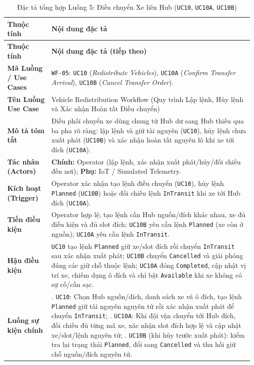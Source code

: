 {\small
\begin{longtable}{>{\raggedright\arraybackslash\bfseries}p{3.5cm} >{\raggedright\arraybackslash}p{\dimexpr\textwidth-3.5cm-4\tabcolsep\relax}}
\caption{Đặc tả tổng hợp Luồng 5: Điều chuyển Xe liên Hub (\texttt{UC10}, \texttt{UC10A}, \texttt{UC10B})} \label{tab:wf-redist} \\
\toprule
Thuộc tính & \textbf{Nội dung đặc tả} \\
\midrule
\endfirsthead
\toprule
Thuộc tính & \textbf{Nội dung đặc tả (tiếp theo)} \\
\midrule
\endhead
\bottomrule
\endfoot
Mã Luồng / Use Cases & \texttt{WF-05}: \texttt{UC10} (\textit{Redistribute Vehicles}), \texttt{UC10A} (\textit{Confirm Transfer Arrival}), \texttt{UC10B} (\textit{Cancel Transfer Order}). \\
Tên Luồng Use Case & Vehicle Redistribution Workflow (Quy trình Lập lệnh, Hủy lệnh và Xác nhận Hoàn tất Điều chuyển) \\
Mô tả tóm tắt & Điều phối chuyển xe dùng chung từ Hub dư sang Hub thiếu qua ba pha rõ ràng: lập lệnh và giữ tài nguyên (\texttt{UC10}), hủy lệnh chưa xuất phát (\texttt{UC10B}) và xác nhận hoàn tất nguyên lô khi xe tới đích (\texttt{UC10A}). \\
Tác nhân (Actors) & \textbf{Chính:} Operator (lập lệnh, xác nhận xuất phát/hủy/đối chiếu đến nơi); \textbf{Phụ:} IoT / Simulated Telemetry. \\
Kích hoạt (Trigger) & Operator xác nhận tạo lệnh điều chuyển (\texttt{UC10}), hủy lệnh \texttt{Planned} (\texttt{UC10B}) hoặc đối chiếu lệnh \texttt{InTransit} khi xe tới Hub đích (\texttt{UC10A}). \\
Tiền điều kiện & Operator hợp lệ; tạo lệnh cần Hub nguồn/đích khác nhau, xe đủ điều kiện và đủ slot đích; \texttt{UC10B} yêu cầu lệnh \texttt{Planned} (xe còn ở nguồn); \texttt{UC10A} yêu cầu lệnh \texttt{InTransit}. \\
Hậu điều kiện & \texttt{UC10} tạo lệnh \texttt{Planned} giữ xe/slot đích rồi chuyển \texttt{InTransit} sau xác nhận xuất phát; \texttt{UC10B} chuyển \texttt{Cancelled} và giải phóng đúng các giữ chỗ thuộc lệnh; \texttt{UC10A} đóng \texttt{Completed}, cập nhật vị trí xe, chiếm dụng ô đích và chỉ bật \texttt{Available} khi xe không có sự cố/cần sạc. \\
Luồng sự kiện chính & 1. \texttt{UC10}: Chọn Hub nguồn/đích, danh sách xe và ô đích, tạo lệnh \texttt{Planned} giữ tài nguyên nguyên tử rồi xác nhận xuất phát để chuyển \texttt{InTransit}; \newline 2. \texttt{UC10A}: Khi đội vận chuyển tới Hub đích, đối chiếu đủ từng mã xe, xác nhận slot đích hợp lệ và cập nhật xe/slot/lệnh nguyên tử; \newline 3. \texttt{UC10B} (khi hủy trước xuất phát): kiểm tra lại trạng thái \texttt{Planned}, đổi sang \texttt{Cancelled} và thu hồi giữ chỗ nguồn/đích nguyên tử. \\

\end{longtable}}
